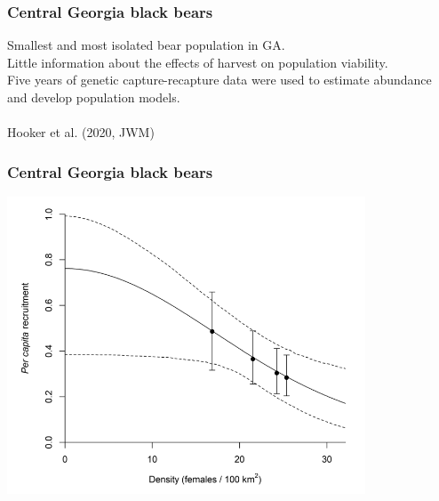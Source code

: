 \documentclass[color=usenames,dvipsnames]{beamer}\usepackage[]{graphicx}\usepackage[]{xcolor}
\begin{document}
\begin{frame}
  \frametitle{Central Georgia black bears}
  Smallest and most isolated bear population in GA. \\
  \vfill
  Little information about the effects of harvest on population viability. \\
  \vfill
  Five years of genetic capture-recapture data were used to estimate
  abundance and develop population models. \\
  \vfill
  \centering
   \\
  \vfill
  \tiny
  \flushright
  Hooker et al. (2020, JWM) \\
\end{frame}




\begin{frame}
  \frametitle{Central Georgia black bears}
  \centering
  \includegraphics[width=0.8\textwidth]{figs/ga-bears-recruitment}\\
\end{frame}
\end{document}
